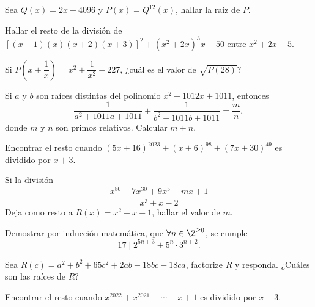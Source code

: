 \begin{section-problem}
    Sea $Q(x) = 2x - 4096$ y $P(x) = Q^{12}(x)$, hallar la raíz de $P$.
\end{section-problem}

\begin{section-problem}
    Hallar el resto de la división de $\left[(x - 1)(x)(x + 2)(x + 3)\right]^2 + (x^2 + 2x)^3 x - 50$ entre $x^2 + 2x - 5$.
\end{section-problem}

\begin{section-problem}
    Si $P\left(x + \dfrac{1}{x}\right) = x^2 + \dfrac{1}{x^2} + 227$, ¿cuál es el valor de $\sqrt {P(28)}$?
\end{section-problem}

\begin{section-problem}
    Si $a$ y $b$ son raíces distintas del polinomio $x^2 + 1012x + 1011$, entonces
    \[\frac{1}{a^2 + 1011a + 1011} + \frac{1}{b^2 + 1011b + 1011} = \frac{m}{n},\]
    donde $m$ y $n$ son primos relativos.
    Calcular $m + n$.
\end{section-problem}

\begin{section-problem}
    Encontrar el resto cuando $(5x + 16)^{2023} + (x + 6)^{98} + (7x + 30)^{49}$ es dividido por $x + 3$.
\end{section-problem}

\begin{section-problem}
    Si la división
    \[\frac{x^{80} - 7 x^{30} + 9x^5 - mx + 1}{x^3 + x - 2}\]
    Deja como resto a $R(x) = x^2 + x - 1$, hallar el valor de $m$.
\end{section-problem}

\begin{section-problem}
    Demostrar por inducción matemática, que $\forall n \in \Z^{\geq 0}$, se cumple
    \[17 \mid 2^{5n + 3} + 5^n \cdot 3^{n + 2}.\]
\end{section-problem}

\begin{section-problem}
    Sea $R(c) = a^2 + b^2 + 65c^2 + 2ab - 18bc - 18ca$, factorize $R$ y responda.
    ¿Cuáles son las raíces de $R$?
\end{section-problem}

\begin{section-problem}
    Encontrar el resto cuando $x^{2022} + x^{2021} + \cdots + x + 1$ es dividido por $x - 3$.
\end{section-problem}

